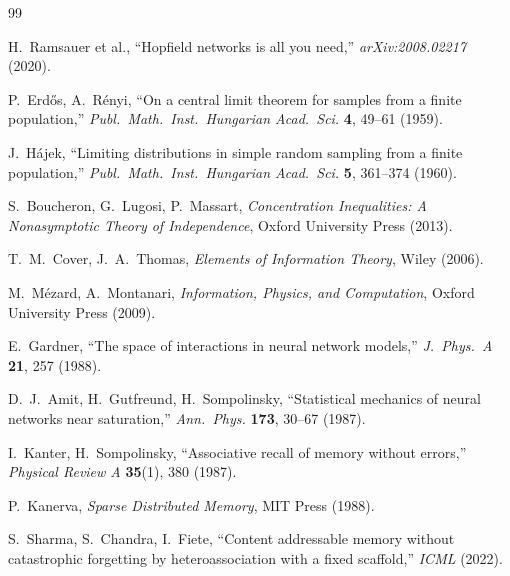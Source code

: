 \documentclass[11pt]{article}
\begin{document}
\begin{thebibliography}{99}

 H.~Ramsauer et al., ``Hopfield networks is all you need,'' \textit{arXiv:2008.02217} (2020).

 P.~Erd\H{o}s, A.~R\'enyi, ``On a central limit theorem for samples from a finite population,'' \textit{Publ.\ Math.\ Inst.\ Hungarian Acad.\ Sci.} \textbf{4}, 49--61 (1959).

 J.~H\'ajek, ``Limiting distributions in simple random sampling from a finite population,'' \textit{Publ.\ Math.\ Inst.\ Hungarian Acad.\ Sci.} \textbf{5}, 361--374 (1960).

 S.~Boucheron, G.~Lugosi, P.~Massart, \textit{Concentration Inequalities: A Nonasymptotic Theory of Independence}, Oxford University Press (2013).

 T.~M.~Cover, J.~A.~Thomas, \textit{Elements of Information Theory}, Wiley (2006).

 M.~M\'ezard, A.~Montanari, \textit{Information, Physics, and Computation}, Oxford University Press (2009).

 E.~Gardner, ``The space of interactions in neural network models,'' \textit{J.\ Phys.\ A} \textbf{21}, 257 (1988).

 D.~J.~Amit, H.~Gutfreund, H.~Sompolinsky, ``Statistical mechanics of neural networks near saturation,'' \textit{Ann.\ Phys.} \textbf{173}, 30--67 (1987).

 I.~Kanter, H.~Sompolinsky, ``Associative recall of memory without errors,'' \textit{Physical Review A} \textbf{35}(1), 380 (1987).

 P.~Kanerva, \textit{Sparse Distributed Memory}, MIT Press (1988).

 S.~Sharma, S.~Chandra, I.~Fiete, ``Content addressable memory without
catastrophic forgetting by heteroassociation with a fixed scaffold,'' \textit{ICML} (2022).

\end{thebibliography}
\end{document}
